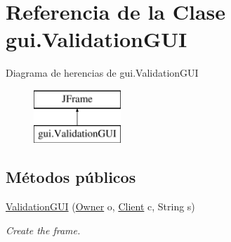 \hypertarget{classgui_1_1_validation_g_u_i}{}\section{Referencia de la Clase gui.\+Validation\+G\+UI}
\label{classgui_1_1_validation_g_u_i}
Diagrama de herencias de gui.\+Validation\+G\+UI\begin{figure}[H]
\begin{center}
\leavevmode
\includegraphics[height=2.000000cm]{classgui_1_1_validation_g_u_i}
\end{center}
\end{figure}
\subsection*{Métodos públicos}
\begin{DoxyCompactItemize}
\item 
\mbox{\hyperlink{classgui_1_1_validation_g_u_i_a090f7d6cae6f5d31fde54362355d47ac}{Validation\+G\+UI}} (\mbox{\hyperlink{classdomain_1_1_owner}{Owner}} o, \mbox{\hyperlink{classdomain_1_1_client}{Client}} c, String s)
\begin{DoxyCompactList}\small\item\em Create the frame. \end{DoxyCompactList}\end{DoxyCompactItemize}
